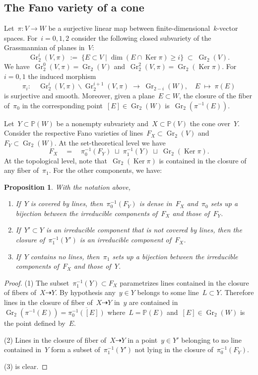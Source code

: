 \documentclass[a4paper]{amsart}
\newcommand{\bbP}{\mathbb{P}}
\newcommand{\dashto}{\dashrightarrow}
\newcommand{\too}{\longrightarrow}
\renewcommand{\ker}{\Ker}
\DeclareMathOperator{\Ker}{Ker}
\DeclareMathOperator{\Gr}{Gr}
\renewcommand{\ge}{\geqslant}
\theoremstyle{plain}
\newtheorem{proposition}[theorem]{Proposition}
\theoremstyle{definition}
\numberwithin{equation}{section}
\begin{document}
\subsection{The Fano variety of a cone} Let~$\pi \colon V \to W$ be a surjective linear map between finite-dimensional~$k$-vector spaces. For~$i = 0, 1, 2$ consider the following closed subvariety of the Grassmannian of planes in~$V$:
\[ \Gr^i_2(V, \pi)  \; := \; \{ E \subset V \mid \dim (E \cap \ker \pi) \ge i \} \; \subset \; \Gr_2(V).\]
We have~$\Gr^0_2(V, \pi) = \Gr_2(V)$ and~$\Gr^2_2(V, \pi) = \Gr_2(\ker \pi)$. For~$i = 0, 1$ the induced morphism
\[ \pi_i \colon \quad  \Gr^i_2(V, \pi) \smallsetminus \Gr^{i+1}_2(V, \pi) \; \too \; \Gr_{2-i}(W), \quad E \; \longmapsto \; \pi(E)\]
is surjective and smooth. Moreover, given a plane~$E \subset W$, the closure of the fiber of~$\pi_0$ in the corresponding point~$[E] \in \Gr_2(W)$ is~$\Gr_2(\pi^{-1}(E))$.

\medskip

  Let~$Y \subset \bbP(W)$ be a nonempty subvariety and~$X \subset \bbP(V)$ the cone over~$Y$. Consider the respective Fano varieties of lines~$F_X \subset \Gr_2(V)$ and~$F_Y \subset \Gr_2(W)$. At the set-theoretical level we have 
\[ F_X \quad = \quad \pi_0^{-1}(F_Y) \; \sqcup \; \pi_1^{-1}(Y) \; \sqcup \; \Gr_2(\ker \pi). \]  
At the topological level, note that~$\Gr_2(\ker \pi)$ is contained in the closure of any fiber of~$\pi_1$. For the other components, we have:

\begin{proposition} \label{Prop:FanoOfACone} With the notation above,
\begin{enumerate}
\item If~$Y$ is covered by lines, then~$\pi_0^{-1}(F_Y)$ is dense in~$F_X$ and~$\pi_0$ sets up a bijection between the irreducible components of~$F_X$ and those of~$F_Y$. \smallskip
\item If~$Y' \subset Y$ is an irreducible component that is not covered by lines, then the closure of~$\pi_1^{-1}(Y')$ is an irreducible component of~$F_{X}$.  \smallskip
\item If~$Y$ contains no lines, then~$\pi_1$ sets up a bijection between the irreducible components of~$F_X$ and those of~$Y$.
\end{enumerate}
\end{proposition}

\begin{proof} (1) The subset~$\pi_1^{-1}(Y) \subset F_X$ parametrizes lines contained in the closure of fibers of~$X \dashto Y$. By hypothesis any~$y \in Y$ belongs to some line~$L \subset Y$. Therefore lines in the closure of fiber of~$X \dashto Y$ in~$y$ are contained in 
$ \Gr_2(\pi^{-1}(E)) = \overline{\pi_0^{-1}([E])}$
where~$L = \bbP(E)$ and~$[E] \in \Gr_2(W)$ is the point defined by~$E$. \smallskip

(2) Lines in the closure of fiber of~$X \dashto Y$ in a point~$y \in Y'$ belonging to no line contained in~$Y$ form a subset of~$\pi_1^{-1}(Y')$ not lying in the closure of~$\pi_0^{-1}(F_Y)$. \smallskip

(3) is clear.
\end{proof}
\end{document}
